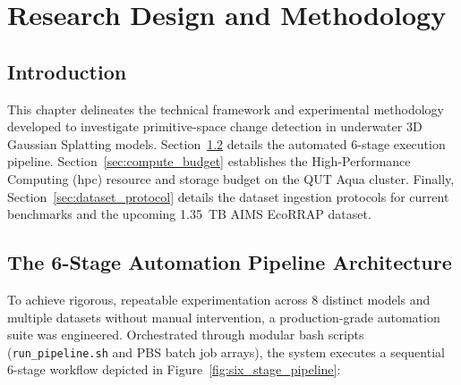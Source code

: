 
\chapter{Research Design and Methodology}
\label{chap:research_design}

\section{Introduction}
\label{sec:design_intro}
This chapter delineates the technical framework and experimental methodology developed to investigate primitive-space change detection in underwater 3D Gaussian Splatting models. Section~\ref{sec:pipeline_arch} details the automated 6-stage execution pipeline. Section~\ref{sec:compute_budget} establishes the High-Performance Computing (\gls{hpc}) resource and storage budget on the QUT Aqua cluster. Finally, Section~\ref{sec:dataset_protocol} details the dataset ingestion protocols for current benchmarks and the upcoming 1.35~TB AIMS EcoRRAP dataset.

\section{The 6-Stage Automation Pipeline Architecture}
\label{sec:pipeline_arch}
To achieve rigorous, repeatable experimentation across 8 distinct models and multiple datasets without manual intervention, a production-grade automation suite was engineered. Orchestrated through modular bash scripts (\texttt{run\_pipeline.sh} and PBS batch job arrays), the system executes a sequential 6-stage workflow depicted in Figure~\ref{fig:six_stage_pipeline}:


